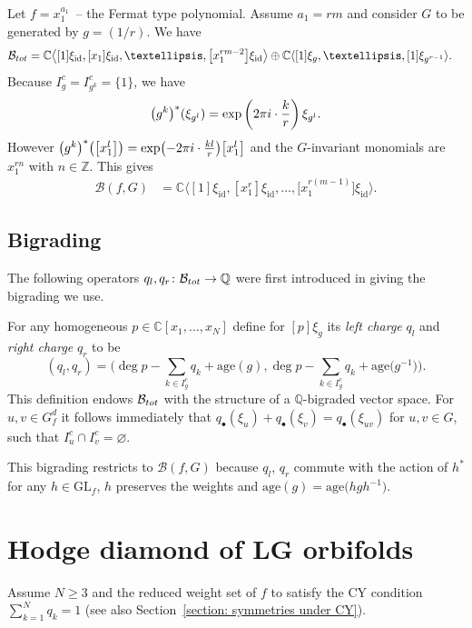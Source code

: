 \documentclass[10pt,a4paper]{article}
\numberwithin{equation}{section}
\newcommand{\CC}{{\mathbb{C}}}
\newcommand{\QQ}{{\mathbb{Q}}}
\newcommand{\ZZ}{{\mathbb{Z}}}
\newcommand{\GL}{{\mathrm{GL}}}
\newcommand{\id}{\mathrm{id}}
\newcommand{\age}{\mathrm{age}}
\def\B{{\mathcal B}}
\begin{document}
\begin{Example}\label{example: Fermat type state space}
	Let $f = x_1^{a_1}$~-- the Fermat type polynomial. Assume $a_1 = rm$ and consider $G$ to be generated by $g = (1/r)$. We have
	\begin{align*}
		\B_{\rm tot} &= \CC \bigl\langle [1]\xi_{\id}, [x_1]\xi_{\id}, \dots,\bigl[x_1^{rm-2}\bigr] \xi_\id \bigr\rangle \oplus \CC\langle [1]\xi_{g},\dots,[1]\xi_{g^{r-1}} \rangle.
	\end{align*}
	Because $I_g^c = I_{g^k}^c = \{1\}$, we have
	\[
		 \bigl(g^k \bigr)^*(\xi_{g^l}) = \exp\left( 2 \pi {\rm i} \cdot \frac{k}{r}\right) \xi_{g^l}.
	\]
	However $\bigl(g^k\bigr)^*\bigl(\bigl[x_1^l\bigr]\bigr) = \exp\bigl(-2 \pi {\rm i} \cdot \frac{kl}{r}\bigr) \bigl[x_1^l\bigr]$ and the $G$-invariant monomials are $x_1^{rn}$ with $n \in \ZZ$. This gives
	\begin{align*}
		\B(f,G) &= \CC \bigl\langle [1]\xi_{\id},[x_1^r]\xi_{\id}, \dots, \bigl[x_1^{r(m-1)}\bigr]\xi_{\id}\bigr\rangle.
	\end{align*}
\end{Example}

\subsection{Bigrading}\label{section: bigrading}
The following operators $q_l, q_r \colon \B_{\rm tot} \to \QQ$ were first introduced in \cite{IV90} giving the bigrading we use.

For any homogeneous $p \in \CC[x_1,\dots,x_N]$ define for $[p]\xi_g$ its {\itshape left charge} $q_l$ and {\itshape right charge} $q_r$ to be
\begin{equation}\label{eq: left right charges}
 (q_l, q_r) = \biggl(\deg p - \sum_{k \in I_g^c} q_{k} + \age{(g)}, \deg p - \sum_{k \in I_g^c} q_{k} + \age{\bigl(g^{-1}\bigr)} \biggr).
\end{equation}
This definition endows $\B_{\rm tot}$ with the structure of a $\QQ$-bigraded vector space.
For $u,v\in G_f^d$ it follows immediately that $q_\bullet (\xi_u) + q_\bullet (\xi_v) = q_\bullet (\xi_{uv})$ for $u,v\in G$, such that $I_u^c \cap I_v^c = \varnothing$.

This bigrading restricts to $\B(f,G)$ because $q_l$, $q_r$ commute with the action of $h^\ast$ for any $h \in \GL_f$, $h$ preserves the weights and $\age(g)=\age\bigl(hgh^{-1}\bigr)$.

\section{Hodge diamond of LG orbifolds}
Assume $N \ge 3$ and the reduced weight set of $f$ to satisfy the CY condition ${\sum_{k=1}^N q_k = 1}$ (see also Section~\ref{section: symmetries under CY}).
\end{document}
